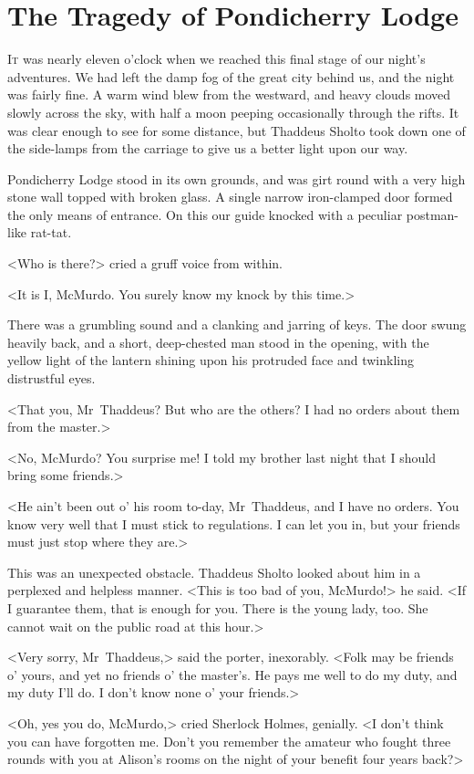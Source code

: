 \chapter{The Tragedy of Pondicherry Lodge}
\lettrine{I}{t} was nearly eleven o'clock when we reached this final stage of our night's adventures. We had left the damp fog of the great city behind us, and the night was fairly fine. A warm wind blew from the westward, and heavy clouds moved slowly across the sky, with half a moon peeping occasionally through the rifts. It was clear enough to see for some distance, but Thaddeus Sholto took down one of the side-lamps from the carriage to give us a better light upon our way.

Pondicherry Lodge stood in its own grounds, and was girt round with a very high stone wall topped with broken glass. A single narrow iron-clamped door formed the only means of entrance. On this our guide knocked with a peculiar postman-like rat-tat.

<Who is there?> cried a gruff voice from within.

<It is I, McMurdo. You surely know my knock by this time.>

There was a grumbling sound and a clanking and jarring of keys. The door swung heavily back, and a short, deep-chested man stood in the opening, with the yellow light of the lantern shining upon his protruded face and twinkling distrustful eyes.

<That you, Mr~Thaddeus? But who are the others? I had no orders about them from the master.>

<No, McMurdo? You surprise me! I told my brother last night that I should bring some friends.>

<He ain't been out o' his room to-day, Mr~Thaddeus, and I have no orders. You know very well that I must stick to regulations. I can let you in, but your friends must just stop where they are.>

This was an unexpected obstacle. Thaddeus Sholto looked about him in a perplexed and helpless manner. <This is too bad of you, McMurdo!> he said. <If I guarantee them, that is enough for you. There is the young lady, too. She cannot wait on the public road at this hour.>

<Very sorry, Mr~Thaddeus,> said the porter, inexorably. <Folk may be friends o' yours, and yet no friends o' the master's. He pays me well to do my duty, and my duty I'll do. I don't know none o' your friends.>

<Oh, yes you do, McMurdo,> cried Sherlock Holmes, genially. <I don't think you can have forgotten me. Don't you remember the amateur who fought three rounds with you at Alison's rooms on the night of your benefit four years back?>

